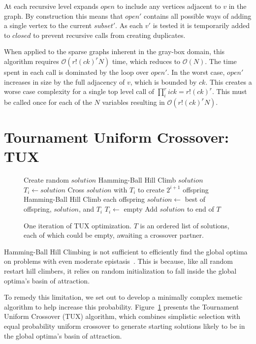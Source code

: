 \documentclass{sig-alternate}
\newcommand{\BigO}[1]{$\mathcal{O}{(#1)}$}
\begin{document}
At each recursive level  expands $open$ to include any vertices
adjacent to $v$ in the graph. By construction this means that $open'$ contains
all possible ways of adding a single vertex to the current $subset'$. As each $v'$
is tested it is temporarily added to $closed$ to prevent recursive calls
from creating duplicates.

When applied to the sparse graphs inherent in the gray-box domain, this algorithm
requires \BigO{r!(ck)^rN} time, which reduces to \BigO{N}. The time spent
in each call is dominated by the loop over $open'$. In the worst case, $open'$
increases in size by the full adjacency of $v$, which is bounded by $ck$.
This creates a worse case complexity for a single top level call of
$\prod_{i}^{r} ick = r!(ck)^r$. This must be called once for each
of the $N$ variables resulting in \BigO{r!(ck)^rN}.

\section{Tournament Uniform Crossover: TUX}
\label{sec-tux}
\begin{figure}
  \begin{algorithmic}[1]
    \State Create random $solution$
    \State Hamming-Ball Hill Climb $solution$
        \State $T_i \leftarrow solution$
        \State \Return
      \EndIf
      \State Cross $solution$ with $T_i$ to create $2^{i+1}$ offspring
      \State Hamming-Ball Hill Climb each offspring
      \State $solution \leftarrow$ best of offspring, $solution$, and $T_i$
      \State $T_i \leftarrow$ empty
    \EndFor
    \State Add $solution$ to end of $T$
  \EndProcedure
\end{algorithmic}
  \caption{One iteration of TUX optimization. $T$ is an
           ordered list of solutions, each of which could be empty,
           awaiting a crossover partner.}
  \label{fig-TUX}
\end{figure}

Hamming-Ball Hill Climbing is not sufficient to efficiently find the global optima
on problems with even moderate epistasis~\cite{chicano:2014:ball}. This is because,
like all random restart hill climbers, it relies on random initialization to fall
inside the global optima's basin of attraction.

To remedy this limitation, we set out to develop a minimally complex memetic
algorithm to help increase this probability. Figure~\ref{fig-TUX} presents
the Tournament Uniform Crossover (TUX) algorithm, which combines simplistic
selection with equal probability uniform crossover to generate starting
solutions likely to be in the global optima's basin of attraction.
\end{document}
